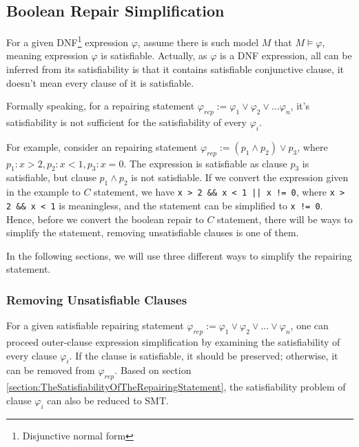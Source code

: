 \subsection{Boolean Repair Simplification}
\label{section:BooleanRepairSimplification}
For a given DNF\footnote{Disjunctive normal form} expression $\varphi$, assume there is such model $M$ that $M \models \varphi$, meaning expression $\varphi$ is satisfiable.
Actually, as $\varphi$ is a DNF expression, all can be inferred from its satisfiability is that it contains satisfiable conjunctive clause, it doesn't mean every clause of it is satisfiable.

Formally speaking, for a repairing statement $\varphi _{rep} := \varphi _{1} \vee \varphi _{2} \vee \dots \varphi _{n}$, it's satisfiability is not sufficient for the satisfiability of every $\varphi _{i}$.

For example, consider an repairing statement $\varphi _{rep} := (p_{1} \wedge p_{2}) \vee p_{3}$, where $p_{1} : x > 2, p_{2} : x < 1, p_{3} : x = 0$. The expression is satisfiable as clause $p_{3}$ is satisfiable,
but clause $p_{1} \wedge p_{2}$ is not satisfiable.
If we convert the expression given in the example to $C$ statement, we have \lstinline{x > 2 && x < 1 || x != 0}, where \lstinline|x > 2 && x < 1| is meaningless, and the statement can be simplified to \lstinline|x != 0|.
Hence, before we convert the boolean repair to $C$ statement, there will be ways to simplify the statement, removing unsatisfiable clauses is one of them.

In the following sections, we will use three different ways to simplify the repairing statement.

\subsubsection{Removing Unsatisfiable Clauses}
For a given satisfiable repairing statement $\varphi _{rep} := \varphi _{1} \vee \varphi _{2} \vee \dots \vee \varphi _{n}$, one can proceed outer-clause expression simplification by examining the satisfiability of every clause $\varphi _{i}$.
If the clause is satisfiable, it should be preserved; otherwise, it can be removed from $\varphi _{rep}$.
Based on section \ref{section:TheSatisfiabilityOfTheRepairingStatement}, the satisfiability problem of clause $\varphi _{i}$ can also be reduced to SMT.

